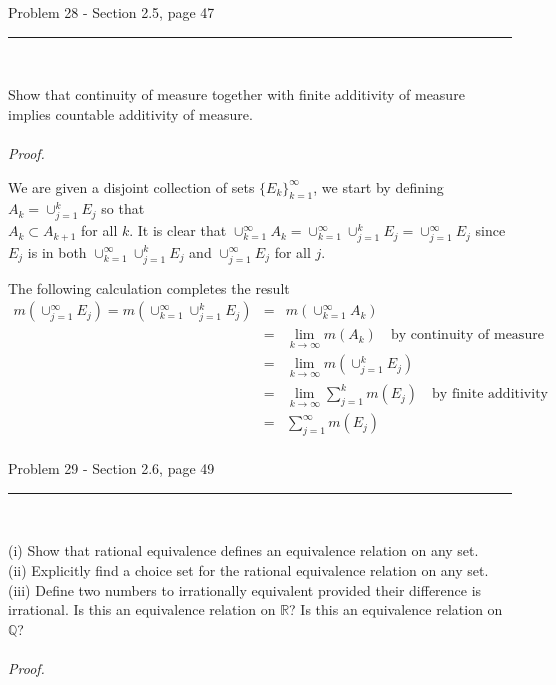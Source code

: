 \documentclass[11pt,reqno]{article}
\begin{document}
\begin{flushleft} 
Problem 28 - Section 2.5, page 47\\
\rule{500pt}{1pt}\\
\end{flushleft} 

Show that continuity of measure together with finite additivity of measure implies countable additivity of measure.
\\\\ \emph{Proof.}
	
We are given a disjoint collection of sets $\{ E_k \}_{k=1}^\infty$, we start by defining $A_k = \cup_{j = 1}^k E_j$ so that \\$A_k \subset A_{k + 1}$ for all $k$. 
It is clear that $\cup_{k = 1}^\infty A_k = \cup_{k = 1}^\infty \cup_{j = 1}^k E_j = \cup_{j = 1}^\infty E_j$ since $E_j$ is in both $\cup_{k = 1}^\infty \cup_{j = 1}^k E_j$ and  $\cup_{j = 1}^\infty E_j$ for all $j$.

The following calculation completes the result
\begin{eqnarray*}
m(\cup_{j = 1}^\infty E_j) = m(\cup_{k =1}^\infty \cup_{j = 1}^k E_j) &=& m(\cup_{k = 1}^\infty A_k) \\
&=& \lim_{k \to \infty } m(A_k) \quad \text{by continuity of measure} \\
&=& \lim_{k \to \infty } m(\cup_{j = 1}^k E_j) \\
&=& \lim_{k \to \infty } \sum_{j = 1}^k m(E_j) \quad \text{by finite additivity} \\
&=& \sum_{j = 1}^\infty m(E_j) \\
\end{eqnarray*}


\begin{flushleft} 
Problem 29 - Section 2.6, page 49\\
\rule{500pt}{1pt}\\
\end{flushleft} 

\noindent (i) Show that rational equivalence defines an equivalence relation on any set.\\
(ii) Explicitly find a choice set for the rational equivalence relation on any set.\\
(iii) Define two numbers to irrationally equivalent provided their difference is irrational. Is this an equivalence relation on $\mathbb{R}$? Is this an equivalence relation on $\mathbb{Q}$?
\\\\ \emph{Proof.}
\end{document}

